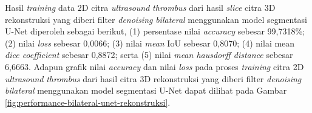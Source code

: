 \begin{enumerate}
	Hasil \textit{training} data 2D citra \textit{ultrasound} \textit{thrombus} dari hasil \textit{slice} citra 3D rekonstruksi yang diberi filter \textit{denoising} \textit{bilateral} menggunakan model segmentasi U-Net diperoleh sebagai berikut, (1) persentase nilai \textit{accuracy} sebesar 99,7318\%; (2) nilai \textit{loss} sebesar 0,0066; (3) nilai \textit{mean} IoU sebesar 0,8070; (4) nilai mean \textit{dice coefficient} sebesar 0,8872; serta (5) nilai \textit{mean hausdorff distance} sebesar 6,6663. Adapun grafik nilai \textit{accuracy} dan nilai \textit{loss} pada proses \textit{training} citra 2D \textit{ultrasound} \textit{thrombus} dari hasil citra 3D rekonstruksi yang diberi filter \textit{denoising} \textit{bilateral} menggunakan model segmentasi U-Net dapat dilihat pada Gambar \ref{fig:performance-bilateral-unet-rekonstruksi}.
	

\end{enumerate}
